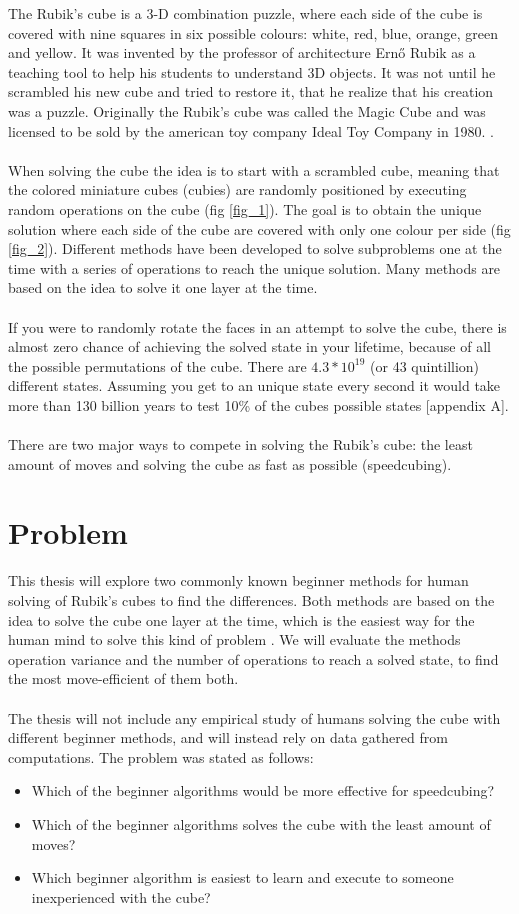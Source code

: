 \documentclass[a4paper,11pt]{kth-mag}
\begin{document}
The Rubik’s cube is a 3-D combination puzzle, where each side of the cube is covered with nine squares in six possible colours: white, red, blue, orange, green and yellow. It was invented by the professor of architecture Ernő Rubik as a teaching tool to help his students to understand 3D objects. It was not until he scrambled his new cube and tried to restore it, that he realize that his creation was a puzzle. Originally the Rubik's cube was called the Magic Cube and was licensed to be sold by the american toy company Ideal Toy Company in 1980. \cite{Rubiks}.\\\\
When solving the cube the idea is to start with a scrambled cube, meaning that the colored miniature cubes (cubies) are randomly positioned by executing random operations on the cube (fig \ref{fig_1}). The goal is to obtain the unique solution where each side of the cube are covered with only one colour per side (fig \ref{fig_2}). Different methods have been developed to solve subproblems one at the time with a series of operations to reach the unique solution. Many methods are based on the idea to solve it one layer at the time.\\\\
If you were to randomly rotate the faces in an attempt to solve the cube, there is almost zero chance of achieving the solved state in your lifetime, because of all the possible permutations of the cube. There are $4.3 * 10^{19}$ (or 43 quintillion) \cite{Faculty} different states. Assuming you get to an unique state every second it would take more than 130 billion years to test 10\% of the cubes possible states [appendix A].\\\\
There are two major ways to compete in solving the Rubik’s cube: the least amount of moves and solving the cube as fast as possible (speedcubing).

\section{Problem}
This thesis will explore two commonly known beginner methods for human solving of Rubik’s cubes to find the differences. Both methods are based on the idea to solve the cube one layer at the time, which is the easiest way for the human mind to solve this kind of problem \cite{Lar5}. We will evaluate the methods operation variance and the number of operations to reach a solved state, to find the most move-efficient of them both.\\\\
The thesis will not include any empirical study of humans solving the cube with different beginner methods, and will instead rely on data gathered from computations.
The problem was stated as follows:
\begin{itemize}
\item[] Which of the beginner algorithms would be more effective for speedcubing?
\item[] Which of the beginner algorithms solves the cube with the least amount of moves?
\item[] Which beginner algorithm is easiest to learn and execute to someone inexperienced with the cube?
\end{itemize}
\end{document}
